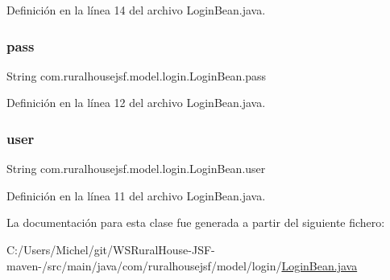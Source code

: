 Definición en la línea 14 del archivo Login\+Bean.\+java.

\mbox{\label{classcom_1_1ruralhousejsf_1_1model_1_1login_1_1_login_bean_a4abf487aa0d370809a4f737dd87dbdd7}} 
\subsubsection{\texorpdfstring{pass}{pass}}
{\footnotesize\ttfamily String com.\+ruralhousejsf.\+model.\+login.\+Login\+Bean.\+pass\hspace{0.3cm}{\ttfamily [private]}}



Definición en la línea 12 del archivo Login\+Bean.\+java.

\mbox{\label{classcom_1_1ruralhousejsf_1_1model_1_1login_1_1_login_bean_a06e00e34aacd95ab04a33bae5bc50b34}} 
\subsubsection{\texorpdfstring{user}{user}}
{\footnotesize\ttfamily String com.\+ruralhousejsf.\+model.\+login.\+Login\+Bean.\+user\hspace{0.3cm}{\ttfamily [private]}}



Definición en la línea 11 del archivo Login\+Bean.\+java.



La documentación para esta clase fue generada a partir del siguiente fichero\+:\begin{DoxyCompactItemize}
\item 
C\+:/\+Users/\+Michel/git/\+W\+S\+Rural\+House-\/\+J\+S\+F-\/maven-\//src/main/java/com/ruralhousejsf/model/login/\mbox{\hyperlink{_login_bean_8java}{Login\+Bean.\+java}}\end{DoxyCompactItemize}
